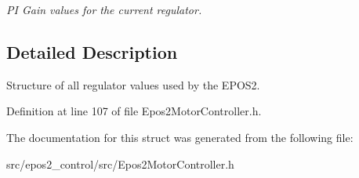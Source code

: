 \begin{DoxyCompactItemize}
\begin{DoxyCompactList}\small\item\em P\-I Gain values for the current regulator. \end{DoxyCompactList}\end{DoxyCompactItemize}


\subsection{Detailed Description}
Structure of all regulator values used by the E\-P\-O\-S2. 

Definition at line 107 of file Epos2\-Motor\-Controller.\-h.



The documentation for this struct was generated from the following file\-:\begin{DoxyCompactItemize}
\item 
src/epos2\-\_\-control/src/Epos2\-Motor\-Controller.\-h\end{DoxyCompactItemize}
